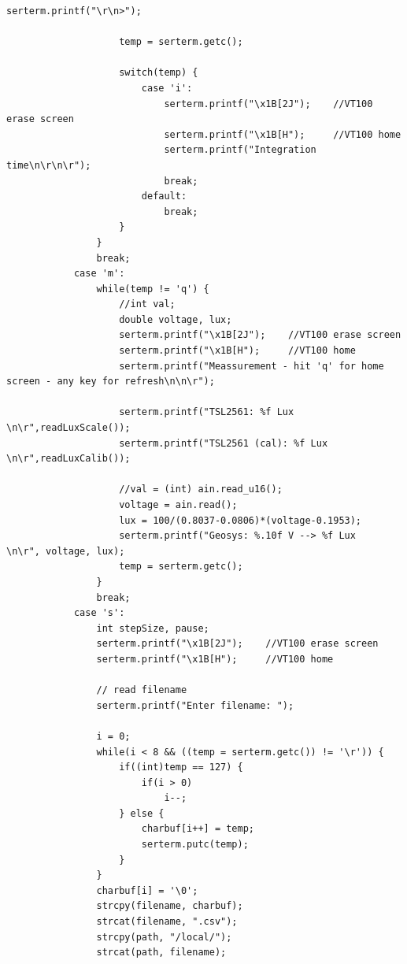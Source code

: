 \documentclass[a4paper,12pt]{scrartcl}
\begin{document}
\begin{lstlisting}[captionpos=b, caption=MBED-Programmcode für den Messaufbau, label=messprogkomplett]
                    serterm.printf("\r\n>");

                    temp = serterm.getc();

                    switch(temp) {
                        case 'i':
                            serterm.printf("\x1B[2J");    //VT100 erase screen
                            serterm.printf("\x1B[H");     //VT100 home
                            serterm.printf("Integration time\n\r\n\r");
                            break;
                        default:
                            break;
                    }
                }
                break;
            case 'm':
                while(temp != 'q') {
                    //int val;
                    double voltage, lux;
                    serterm.printf("\x1B[2J");    //VT100 erase screen
                    serterm.printf("\x1B[H");     //VT100 home
                    serterm.printf("Meassurement - hit 'q' for home screen - any key for refresh\n\n\r");

                    serterm.printf("TSL2561: %f Lux            \n\r",readLuxScale());
                    serterm.printf("TSL2561 (cal): %f Lux            \n\r",readLuxCalib());

                    //val = (int) ain.read_u16();
                    voltage = ain.read();
                    lux = 100/(0.8037-0.0806)*(voltage-0.1953);
                    serterm.printf("Geosys: %.10f V --> %f Lux             \n\r", voltage, lux);
                    temp = serterm.getc();
                }
                break;
            case 's':
                int stepSize, pause;
                serterm.printf("\x1B[2J");    //VT100 erase screen
                serterm.printf("\x1B[H");     //VT100 home

                // read filename
                serterm.printf("Enter filename: ");

                i = 0;
                while(i < 8 && ((temp = serterm.getc()) != '\r')) {
                    if((int)temp == 127) {
                        if(i > 0)
                            i--;
                    } else {
                        charbuf[i++] = temp;
                        serterm.putc(temp);
                    }
                }
                charbuf[i] = '\0';
                strcpy(filename, charbuf);
                strcat(filename, ".csv");
                strcpy(path, "/local/");
                strcat(path, filename);


\end{lstlisting}
\end{document}
